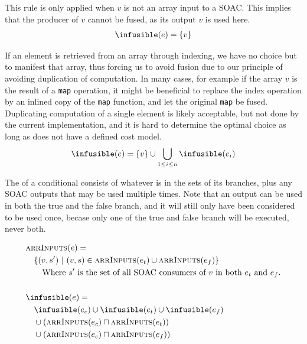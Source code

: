 \begin{description}[style=nextline]
\item[Case $e \equiv v$ ($v$ is a variable)]

  This rule is only applied when $v$ is not an array input to a SOAC.
  This implies that the producer of $v$ cannot be fused, as its output
  $v$ is used here.
\begin{align*}
  & \infusible(e) = \{v\} \\
\end{align*}

\item[Case $e \equiv \texttt{$v$[$e_{1}$, \ldots, $e_{n}$]}$]

  If an element is retrieved from an array through indexing, we have
  no choice but to manifest that array, thus forcing us to avoid
  fusion due to our principle of avoiding duplication of computation.
  In many cases, for example if the array $v$ is the result of a
  \texttt{map} operation, it might be beneficial to replace the index
  operation by an inlined copy of the \texttt{map} function, and let
  the original \texttt{map} be fused.  Duplicating computation of a
  single element is likely acceptable, but not done by the current
  implementation, and it is hard to determine the optimal choice as
  long as \LO{} does not have a defined cost model. 
  \begin{align*}
  & \infusible(e) = \{v\} \cup \bigcup_{1\leq i \leq n}\infusible(e_{i}) \\
\end{align*}

\item[Case $e \equiv \texttt{if $e_{c}$ then $e_{t}$ else $e_{f}$}$]

  The \infusible{} of a conditional consists of whatever is in the
  \infusible{} sets of its branches, plus any SOAC outputs that may be
  used multiple times.  Note that an output can be used in both the
  true and the false branch, and it will still only have been
  considered to be used once, becase only one of the true and false
  branch will be executed, never both.


\begin{align*}
  & \inputs(e) =\\
  & \quad \{ (v,s')\ |\ (v,s) \in \inputs(e_{t}) \cup \inputs(e_{f}) \}\\
  & \quad\quad \text{Where $s'$ is the set of all SOAC consumers of $v$ in both $e_{t}$ and $e_{f}$.} \\
  \\
  & \infusible(e) =\\
  & \quad \infusible(e_{c}) \cup \infusible(e_{t}) \cup \infusible(e_{f})\\
  & \quad \cup (\inputs(e_{c}) \sqcap \inputs(e_{t}))\\
  & \quad \cup (\inputs(e_{c}) \sqcap \inputs(e_{f}))\\
\end{align*}


\end{description}
